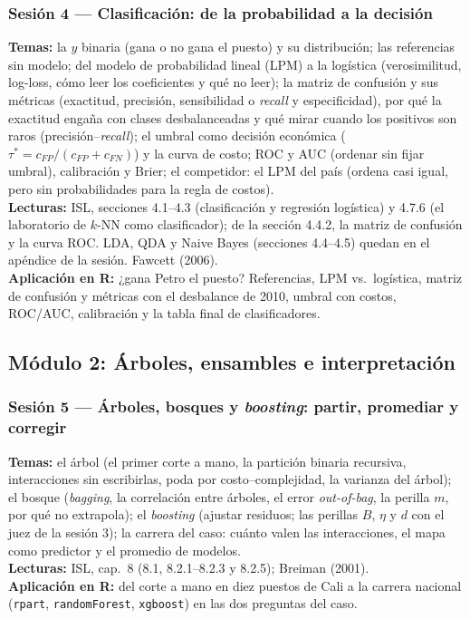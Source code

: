 \documentclass[12pt,a4paper]{article}
\begin{document}
\subsubsection{Sesión 4 --- Clasificación: de la probabilidad a la decisión}
\textbf{Temas:} la $y$ binaria (gana o no gana el puesto) y su distribución; las referencias sin modelo; del modelo de probabilidad lineal (LPM) a la logística (verosimilitud, log-loss, cómo leer los coeficientes y qué no leer); la matriz de confusión y sus métricas (exactitud, precisión, sensibilidad o \emph{recall} y especificidad), por qué la exactitud engaña con clases desbalanceadas y qué mirar cuando los positivos son raros (precisión--\emph{recall}); el umbral como decisión económica ($\tau^* = c_{FP}/(c_{FP}+c_{FN})$) y la curva de costo; ROC y AUC (ordenar sin fijar umbral), calibración y Brier; el competidor: el LPM del país (ordena casi igual, pero sin probabilidades para la regla de costos). \\
\textbf{Lecturas:} ISL, secciones 4.1--4.3 (clasificación y regresión logística) y 4.7.6 (el laboratorio de $k$-NN como clasificador); de la sección 4.4.2, la matriz de confusión y la curva ROC. LDA, QDA y Naive Bayes (secciones 4.4--4.5) quedan en el apéndice de la sesión. Fawcett (2006). \\
\textbf{Aplicación en R:} ¿gana Petro el puesto? Referencias, LPM vs.\ logística, matriz de confusión y métricas con el desbalance de 2010, umbral con costos, ROC/AUC, calibración y la tabla final de clasificadores.

\subsection{Módulo 2: Árboles, ensambles e interpretación}

\subsubsection{Sesión 5 --- Árboles, bosques y \emph{boosting}: partir, promediar y corregir}
\textbf{Temas:} el árbol (el primer corte a mano, la partición binaria recursiva, interacciones sin escribirlas, poda por costo--complejidad, la varianza del árbol); el bosque (\emph{bagging}, la correlación entre árboles, el error \emph{out-of-bag}, la perilla $m$, por qué no extrapola); el \emph{boosting} (ajustar residuos; las perillas $B$, $\eta$ y $d$ con el juez de la sesión 3); la carrera del caso: cuánto valen las interacciones, el mapa como predictor y el promedio de modelos. \\
\textbf{Lecturas:} ISL, cap.\ 8 (8.1, 8.2.1--8.2.3 y 8.2.5); Breiman (2001). \\
\textbf{Aplicación en R:} del corte a mano en diez puestos de Cali a la carrera nacional (\texttt{rpart}, \texttt{randomForest}, \texttt{xgboost}) en las dos preguntas del caso.
\end{document}
